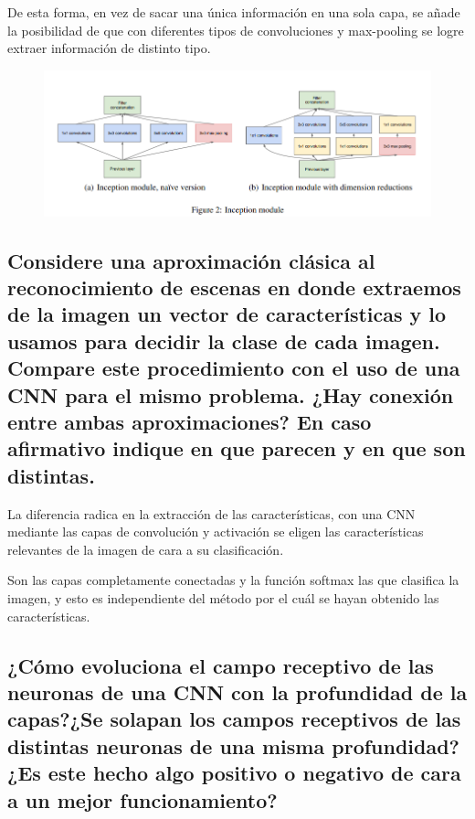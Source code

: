 \documentclass[11pt]{scrartcl} %
\begin{document}
De esta forma, en vez de sacar una única información en una sola capa, se añade
la posibilidad de que con diferentes tipos de convoluciones y max-pooling se logre
extraer información de distinto tipo.

\begin{figure}[h]
	\centering
	\includegraphics[width=1.0\columnwidth]{2.png}
\end{figure}

\subsection{Considere una aproximación clásica al reconocimiento de escenas
en donde extraemos de la imagen un vector de características y lo
usamos para decidir la clase de cada imagen. Compare este
procedimiento con el uso de una CNN para el mismo problema. ¿Hay
conexión entre ambas aproximaciones? En caso afirmativo indique en
que parecen y en que son distintas.}


La diferencia radica en la extracción de las características, con una CNN 
mediante las capas de convolución y activación se eligen las características
relevantes de la imagen de cara a su clasificación. \newline

Son las capas completamente conectadas y la función softmax las que clasifica la
imagen, y esto es independiente del método por el cuál se hayan obtenido las
características.

\newpage

\subsection{¿Cómo evoluciona el campo receptivo de las neuronas de una CNN
con la profundidad de la capas?\newline ¿Se solapan los campos receptivos de
las distintas neuronas de una misma profundidad?\newline ¿Es este hecho algo
positivo o negativo de cara a un mejor funcionamiento?}
\end{document}
